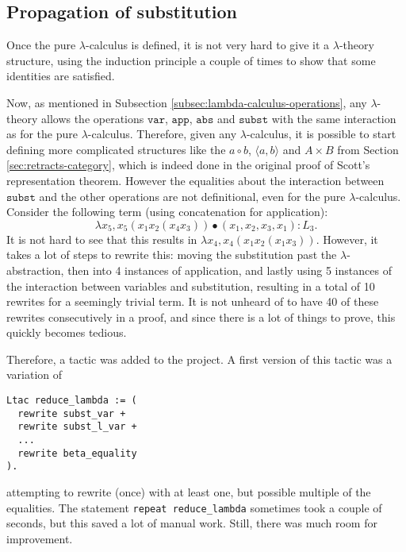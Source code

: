\subsection{Propagation of substitution}
Once the pure $ \lambda $-calculus is defined, it is not very hard to give it a $ \lambda $-theory structure, using the induction principle a couple of times to show that some identities are satisfied.

Now, as mentioned in Subsection \ref{subsec:lambda-calculus-operations}, any $ \lambda $-theory allows the operations $ \mathtt{var} $, $ \mathtt{app} $, $ \mathtt{abs} $ and $ \mathtt{subst} $ with the same interaction as for the pure $ \lambda $-calculus. Therefore, given any $ \lambda $-calculus, it is possible to start defining more complicated structures like the $ a \circ b $, $ \langle a, b \rangle $ and $ A \times B $ from Section \ref{sec:retracts-category}, which is indeed done in the original proof of Scott's representation theorem. However the equalities about the interaction between $ \mathtt{subst} $ and the other operations are not definitional, even for the pure $ \lambda $-calculus. Consider the following term (using concatenation for application):
\[ \lambda x_5, x_5 (x_1 x_2 (x_4 x_3)) \bullet (x_1, x_2, x_3, x_1) : L_3. \]
It is not hard to see that this results in $ \lambda x_4, x_4 (x_1 x_2 (x_1 x_3)) $. However, it takes a lot of steps to rewrite this: moving the substitution past the $ \lambda $-abstraction, then into 4 instances of application, and lastly using 5 instances of the interaction between variables and substitution, resulting in a total of 10 rewrites for a seemingly trivial term. It is not unheard of to have 40 of these rewrites consecutively in a proof, and since there is a lot of things to prove, this quickly becomes tedious.

Therefore, a tactic was added to the project. A first version of this tactic was a variation of
\begin{lstlisting}
Ltac reduce_lambda := (
  rewrite subst_var +
  rewrite subst_l_var +
  ...
  rewrite beta_equality
).
\end{lstlisting}
attempting to rewrite (once) with at least one, but possible multiple of the equalities. The statement \texttt{repeat reduce\_lambda} sometimes took a couple of seconds, but this saved a lot of manual work. Still, there was much room for improvement.

